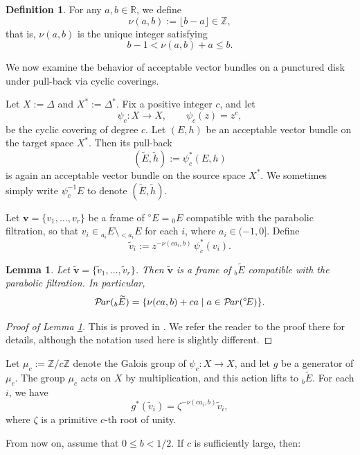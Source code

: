 \documentclass[12pt,twoside]{amsart}
\DeclareMathOperator{\Par}{\mathcal{P}\!\it{ar}}
\newtheorem{lem}[thm]{Lemma}
\theoremstyle{definition}
\newtheorem{defn}[thm]{Definition}
\begin{document}
\begin{defn}\label{x-def10.1}
For any $a,b\in \mathbb R$, we define
\[
\nu(a,b):=\lfloor b-a\rfloor \in \mathbb Z,
\]
that is, $\nu(a,b)$ is the unique integer satisfying
\[
b-1 < \nu(a,b)+a \leq b.
\]
\end{defn}

We now examine the behavior of acceptable vector bundles on a punctured disk 
under pull-back via cyclic coverings.

\medskip

Let $X:=\Delta$ and $X^*:=\Delta^*$.  
Fix a positive integer $c$, and let 
\[
\psi_c \colon X \to X, \qquad \psi_c(z)=z^c,
\]
be the cyclic covering of degree $c$.  
Let $(E,h)$ be an acceptable vector bundle on the target space $X^*$.  
Then its pull-back
\[
(\widetilde E, \widetilde h):=\psi_c^*(E,h)
\]
is again an acceptable vector bundle on the source space $X^*$. 
We sometimes simply write $\psi^{-1}_cE$ to denote $(\widetilde E, \widetilde h)$. 

Let $\bm v=\{v_1,\ldots,v_r\}$ be a frame of 
${}^\diamond\!E={}_0E$ compatible with the parabolic filtration, 
so that $v_i\in {}_{a_i}E\setminus {}_{<a_i}E$ for each $i$, 
where $a_i\in (-1,0]$.  
Define
\[
\widetilde v_i := z^{-\nu(ca_i,b)}\, \psi_c^*(v_i).
\]

\begin{lem}\label{x-lem10.2}
Let $\widetilde {\bm v}=\{\widetilde v_1,\ldots,\widetilde v_r\}$.  
Then $\widetilde {\bm v}$ is a frame of ${}_b\widetilde E$ 
compatible with the parabolic filtration.  
In particular,
\[
\Par({}_b\widetilde E)
=
\{\nu(ca,b)+ca \mid a\in \Par({}^\diamond\!E)\}.
\]
\end{lem}

\begin{proof}[Proof of Lemma \ref{x-lem10.2}]
This is proved in \cite[Lemma~11.2]{fujino-fujisawa-ono}.  
We refer the reader to the proof there for details, 
although the notation used here is slightly different.
\end{proof}

Let $\mu_c := \mathbb{Z}/c\mathbb{Z}$ denote the Galois group of 
$\psi_c \colon X \to X$, and let $g$ be a generator of $\mu_c$.  
The group $\mu_c$ acts on $X$ by multiplication, and this action lifts to 
${}_b \widetilde{E}$. For each $i$, we have
\[
g^*(\widetilde v_i)=\zeta^{-\nu(ca_i,b)} \widetilde v_i,
\]
where $\zeta$ is a primitive $c$-th root of unity.

From now on, assume that $0\le b<1/2$.  
If $c$ is sufficiently large, then:
\end{document}
